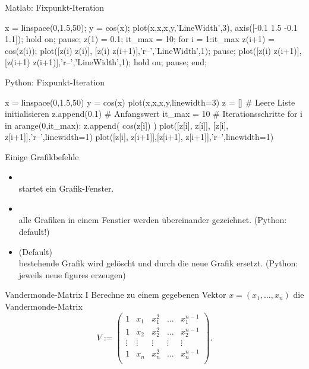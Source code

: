 \documentclass[hyperref={xetex}]{beamer}
\begin{document}
%
%
\begin{frame}[fragile]{Matlab: Fixpunkt-Iteration}
\begin{matlabin}
x = linspace(0,1.5,50);
y = cos(x);
plot(x,x,x,y,'LineWidth',3),
axis([-0.1 1.5 -0.1 1.1]);
hold on;
pause; %
z(1) = 0.1; %
it_max = 10; %
for i = 1:it_max
    z(i+1) = cos(z(i));
    plot([z(i) z(i)], [z(i) z(i+1)],'r--','LineWidth',1);
    pause;
    plot([z(i) z(i+1)],[z(i+1) z(i+1)],'r--','LineWidth',1);
    hold on;
    pause; %
end;
\end{matlabin}
\end{frame}

\begin{frame}[fragile]{Python: Fixpunkt-Iteration}
  \begin{pyin}
x = linspace(0,1.5,50)
y = cos(x)
plot(x,x,x,y,linewidth=3)
z = [] # Leere Liste initialisieren
z.append(0.1) # Anfangswert
it_max = 10 # Iterationsschritte 
for i in arange(0,it_max):
    z.append( cos(z[i]) )   
    plot([z[i], z[i]], [z[i], z[i+1]],'r--',linewidth=1)
    plot([z[i], z[i+1]],[z[i+1], z[i+1]],'r--',linewidth=1)    
  \end{pyin}
\end{frame}
%
%
\begin{frame}[fragile]{Einige Grafikbefehle}
\begin{itemize}
\item \alert{ } \\
startet ein Grafik-Fenster.
\item \alert{ }\\
 alle Grafiken in einem Fenstier werden \"ubereinander gezeichnet. (Python: default!)
\item \alert{ } (Default)\\
 bestehende Grafik wird gel\"oscht und durch die neue Grafik ersetzt. (Python: jeweils neue figures erzeugen)
\end{itemize}
\end{frame}
\begin{frame}[fragile]{Vandermonde-Matrix I}
Berechne zu einem gegebenen Vektor
  $x=(x_1, \dots ,x_n)$ die Vandermonde-Matrix
{ \[ V:= \left(\begin{array}{ccccc} 
1 & x_1 & x_1^2 & \hdots & x_1^{n-1}\\
1 & x_2 & x_2^2 & \hdots & x_2^{n-1}\\
\vdots & \vdots & \vdots & \vdots & \vdots\\
1 & x_n & x_n^2 & \hdots & x_n^{n-1}\\
\end{array} \right).  \]}
\end{frame}
\end{document}
